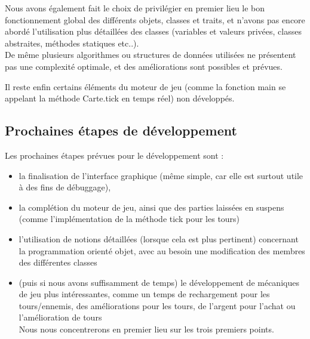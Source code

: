 \documentclass{article}
\begin{document}
Nous avons également fait le choix de privilégier en premier lieu le bon fonctionnement global des différents objets, classes et traits, et n'avons pas encore abordé l'utilisation plus détaillées des classes (variables et valeurs privées, classes abstraites, méthodes statiques etc..).\\
De même plusieurs algorithmes ou structures de données utilisées ne présentent pas une complexité optimale, et des améliorations sont possibles et prévues.

Il reste enfin certains éléments du moteur de jeu (comme la fonction main se appelant la méthode Carte.tick en temps réel) non développés.


\subsection{Prochaines étapes de développement}

Les prochaines étapes prévues pour le développement sont :

\begin{itemize}
  \item la finalisation de l'interface graphique (même simple, car elle est surtout utile à des fins de débuggage),
  \item la complétion du moteur de jeu, ainsi que des parties laissées en suspens (comme l'implémentation de la méthode tick pour les tours)
  \item l'utilisation de notions détaillées (lorsque cela est plus pertinent) concernant la programmation orienté objet, avec au besoin une modification des membres des différentes classes
  \item (puis si nous avons suffisamment de temps) le développement de mécaniques de jeu plus intéressantes, comme un temps de rechargement pour les tours/ennemis, des améliorations pour les tours, de l'argent pour l'achat ou l'amélioration de tours\\
    Nous nous concentrerons en premier lieu sur les trois premiers points.
\end{itemize}
\end{document}
